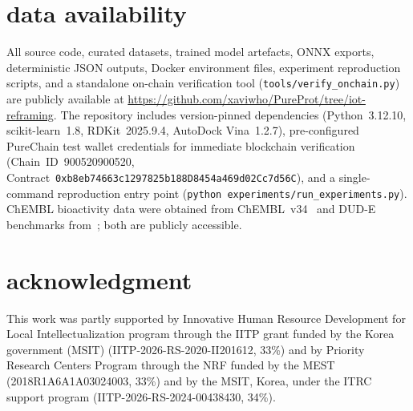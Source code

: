 \documentclass[conference]{IEEEtran}
\begin{document}
\sloppy
\section*{\textbf{data availability}}

All source code, curated datasets, trained model artefacts,
ONNX exports, deterministic JSON outputs, Docker environment
files, experiment reproduction scripts, and a standalone
on-chain verification tool
(\texttt{tools/verify\_onchain.py}) are publicly available
at \url{https://github.com/xaviwho/PureProt/tree/iot-reframing}.
The repository includes version-pinned dependencies
(Python~3.12.10, scikit-learn~1.8, RDKit~2025.9.4,
AutoDock Vina~1.2.7), pre-configured PureChain test wallet
credentials for immediate blockchain verification
(Chain~ID~900520900520,
Contract~\texttt{\mbox{0xb8eb74663c1297825b188D8454a469d02Cc7d56C}}),
and a single-command reproduction entry point
(\texttt{python experiments/run\_experiments.py}).
ChEMBL bioactivity data were obtained from
ChEMBL~v34~\cite{mendez2019chembl} and DUD-E benchmarks
from~\cite{mysinger2012directory}; both are publicly
accessible.


\section *{\textbf{acknowledgment}} 
This work was partly supported by Innovative Human Resource Development for Local Intellectualization program through the IITP grant funded by the Korea government (MSIT) (IITP-2026-RS-2020-II201612, 33\%) and by Priority Research Centers Program through the NRF funded by the MEST (2018R1A6A1A03024003, 33\%) and by the MSIT, Korea, under the ITRC support program (IITP-2026-RS-2024-00438430, 34\%).

\balance



\end{document}
